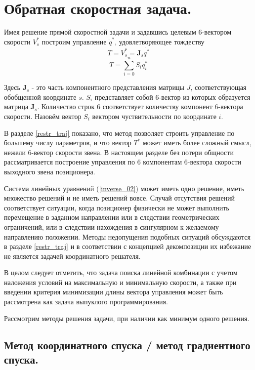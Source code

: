 \section{Обратная скоростная задача.}\label{invspd_sect}

Имея решение прямой скоростной задачи и задавшись целевым 6-вектором скорости $V_s^*$ построим управление $\dot{q}^{*}$, удовлетворяющее тождеству
\begin{equation}\label{inverse_01}
T = V_s^* = \textbf{J}_s\dot{q^*}  
\end{equation}
\begin{equation}\label{inverse_02}
T = \sum_{i=0}^nS_i\dot{q^*_i}  
\end{equation}

Здесь $\textbf{J}_s$ - это часть компонентного представления матрицы \textbf{$J$}, соответствующая обобщенной координате $s$. $S_i$ представляет собой 6-вектор из которых образуется матрица $\textbf{J}_s$. Количество строк $6$ соответствует количеству компонент 6-вектора скорости. Назовём вектор $S_i$ вектором чуствительности по координате $i$.

\colorbox{shadecolor}
{\parbox{0.9\textwidth}{В разделе \ref{restr_traj} показано, что метод позволяет строить управление по большему числу параметров, и что вектор $T^*$ может иметь более сложный смысл, нежели 6-вектор скорости звена. В настоящем разделе без потери общности рассматривается построение управления по 6 компонентам 6-вектора скорости выходного звена позиционера.}}

Система линейных уравнений (\ref{inverse_02}) может иметь одно решение, иметь множество решений и не иметь решений вовсе. Случай отсутствия решений соответствует ситуации, когда позиционер физически не может выполнить перемещение в заданном направлении или в следствии геометрических ограничений, или в следствии нахождения в сингулярном к желаемому направлению положении. Методы недопущения подобных ситуаций обсуждаются в разделе \ref{restr_traj} и в соответствии с концепцией декомпозиции их избежание не является задачей координатного решателя. 

В целом следует отметить, что задача поиска линейной комбинации с учетом наложения условий на максимальную и минимальную скорости, а также при введении критерия минимизации длины вектора управления может быть рассмотрена как задача выпуклого программирования.

Рассмотрим методы решения задачи, при наличии как минимум одного решения.

\subsection{Метод координатного спуска / метод градиентного спуска.}

